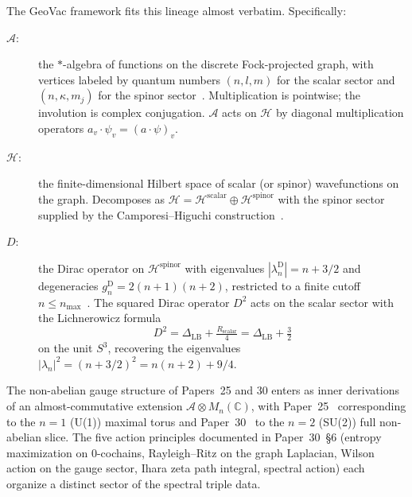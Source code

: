 \documentclass[twocolumn,pra,amsmath,amssymb,superscriptaddress]{revtex4-2}
\begin{document}
The GeoVac framework fits this lineage almost verbatim.  Specifically:

\begin{description}
\item[$\mathcal{A}$:]  the $*$-algebra of functions on the discrete
  Fock-projected graph, with vertices labeled by quantum numbers
  $(n, l, m)$ for the scalar sector and $(n, \kappa, m_j)$ for the
  spinor sector~\cite{paper7}.  Multiplication is pointwise; the
  involution is complex conjugation.  $\mathcal{A}$ acts on
  $\mathcal{H}$ by diagonal multiplication operators
  $a_v \cdot \psi_v = (a \cdot \psi)_v$.
\item[$\mathcal{H}$:]  the finite-dimensional Hilbert space of
  scalar (or spinor) wavefunctions on the graph.  Decomposes as
  $\mathcal{H} = \mathcal{H}^{\mathrm{scalar}} \oplus
  \mathcal{H}^{\mathrm{spinor}}$ with the spinor sector supplied by
  the Camporesi--Higuchi construction~\cite{paper28}.
\item[$D$:]  the Dirac operator on $\mathcal{H}^{\mathrm{spinor}}$
  with eigenvalues $|\lambda_n^{\mathrm{D}}| = n + 3/2$ and
  degeneracies $g_n^{\mathrm{D}} = 2(n+1)(n+2)$, restricted to a
  finite cutoff $n \le n_{\max}$~\cite{paper28}.  The squared Dirac
  operator $D^2$ acts on the scalar sector with the
  Lichnerowicz formula~\cite{lichnerowicz1963}
  \[
    D^2 = \Delta_{\mathrm{LB}} + \tfrac{R_{\mathrm{scalar}}}{4}
    = \Delta_{\mathrm{LB}} + \tfrac{3}{2}
  \]
  on the unit $S^3$, recovering the eigenvalues
  $|\lambda_n|^2 = (n + 3/2)^2 = n(n+2) + 9/4$.
\end{description}

The non-abelian gauge structure of Papers~25 and 30 enters as inner
derivations of an almost-commutative extension
$\mathcal{A} \otimes M_n(\mathbb{C})$, with
Paper~25~\cite{paper25} corresponding to the $n = 1$ (U(1)) maximal
torus and Paper~30~\cite{paper30} to the $n = 2$ (SU(2)) full
non-abelian slice.  The five action principles documented in
Paper~30~\S6 (entropy maximization on 0-cochains, Rayleigh--Ritz on
the graph Laplacian, Wilson action on the gauge sector, Ihara zeta
path integral, spectral action) each organize a distinct sector of the
spectral triple data.
\end{document}
